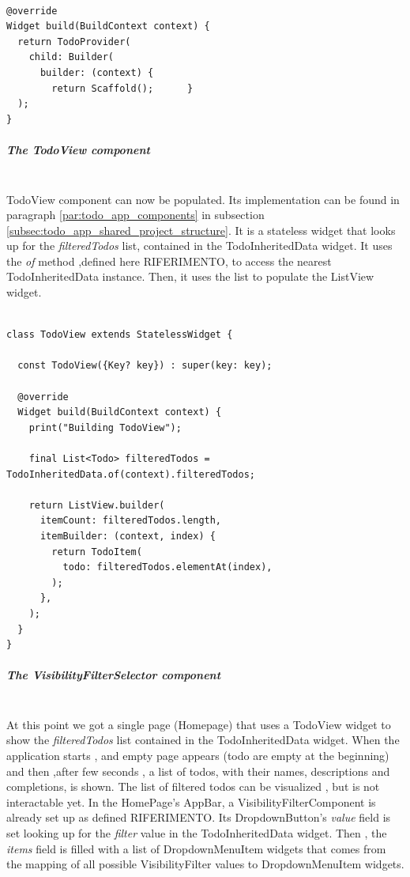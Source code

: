  \mbox{}

\begin{verbatim}

@override
Widget build(BuildContext context) {
  return TodoProvider(
    child: Builder(
      builder: (context) {
        return Scaffold();      }
  );
}
\end{verbatim}

\subparagraph{The TodoView component}\mbox{}\\
\label{subpar:todo_app_inherited_widget_todoview_component}
TodoView component can now be populated. Its implementation can be found in paragraph \ref{par:todo_app_components} in subsection \ref{subsec:todo_app_shared_project_structure}. It is a stateless widget that looks up for the \textit{filteredTodos} list, contained in the TodoInheritedData widget. It uses the \textit{of} method ,defined here RIFERIMENTO, to access the nearest TodoInheritedData instance. Then, it uses the list to populate the ListView widget. 
\mbox{}\\


 \mbox{}

\begin{verbatim}

class TodoView extends StatelessWidget {

  const TodoView({Key? key}) : super(key: key);

  @override
  Widget build(BuildContext context) {
    print("Building TodoView");

    final List<Todo> filteredTodos = TodoInheritedData.of(context).filteredTodos;

    return ListView.builder(
      itemCount: filteredTodos.length,
      itemBuilder: (context, index) {
        return TodoItem(
          todo: filteredTodos.elementAt(index),
        );
      },
    );
  }
}
\end{verbatim}


\subparagraph{The VisibilityFilterSelector component}\mbox{}\\
\label{subpar:todo_app_inherited_widget_visibilityfiltercomponent_component}
At this point we got a single page (Homepage) that uses a TodoView widget to show the \textit{filteredTodos} list contained in the TodoInheritedData widget. When the application starts , and empty page appears (todo are empty at the beginning) and then ,after few seconds , a list of todos, with their names, descriptions and completions, is shown. The list of filtered todos can be visualized , but is not interactable yet. 
In the HomePage’s AppBar, a VisibilityFilterComponent is already set up as defined RIFERIMENTO. Its DropdownButton’s \textit{value} field is set looking up for the \textit{filter} value in the TodoInheritedData widget. Then , the \textit{items} field is filled with a list of DropdownMenuItem widgets that comes from the mapping of all possible VisibilityFilter values to DropdownMenuItem widgets.
\mbox{}\\


